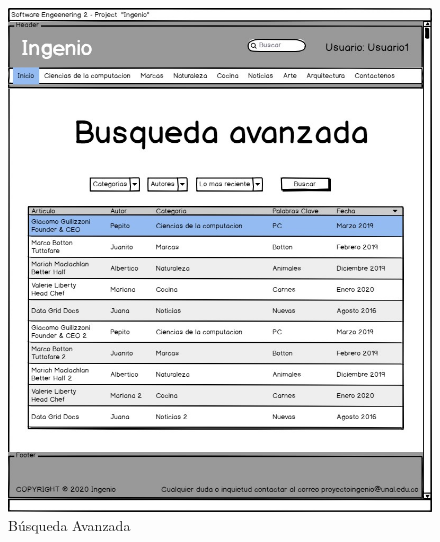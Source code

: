 \documentclass[a4paper,12 pt]{article}
\begin{document}
\begin{figure}[H]
    \centering
    \includegraphics[scale = 1]{images/BusquedaAvanzada.jpg}
    \caption{Búsqueda Avanzada}
    \label{F104}
\end{figure}{}
\end{document}
